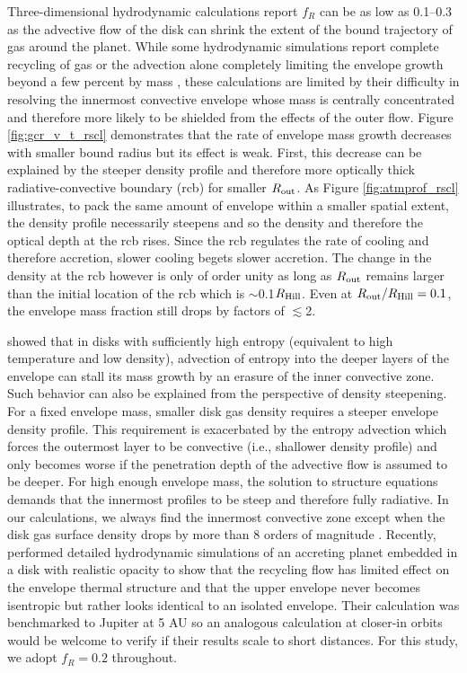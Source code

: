 \documentclass[twocolumn]{aastex631}
\begin{document}
Three-dimensional hydrodynamic calculations report $f_R$ can be as low as 0.1--0.3 \citep{Lambrechts17,Fung19} as the advective flow of the disk can shrink the extent of the bound trajectory of gas around the planet.
While some hydrodynamic simulations report complete recycling of gas or the advection alone completely limiting the envelope growth beyond a few percent by mass \citep[e.g.,][]{Bethune19,Moldenhauer21}, these calculations are limited by their difficulty in resolving the innermost convective envelope whose mass is centrally concentrated \citep{Lee14} and therefore more likely to be shielded from the effects of the outer flow. 
Figure \ref{fig:gcr_v_t_rscl} demonstrates that the rate of envelope mass growth decreases with smaller bound radius but its effect is weak. First, this decrease can be explained by the steeper density profile and therefore more optically thick radiative-convective boundary (rcb) for smaller $R_{\rm out}$. As Figure \ref{fig:atmprof_rscl} illustrates, to pack the same amount of envelope within a smaller spatial extent, the density profile necessarily steepens and so the density and therefore the optical depth at the rcb rises. Since the rcb regulates the rate of cooling and therefore accretion, slower cooling begets slower accretion. The change in the density at the rcb however is only of order unity as long as $R_{\rm out}$ remains larger than the initial location of the rcb which is $\sim$0.1$R_{\rm Hill}$. Even at $R_{\rm out}/R_{\rm Hill} = 0.1$, the envelope mass fraction still drops by factors of $\lesssim$2.

\citet{Ali-Dib20} showed that in disks with sufficiently high entropy (equivalent to high temperature and low density), advection of entropy into the deeper layers of the envelope can stall its mass growth by an erasure of the inner convective zone. Such behavior can also be explained from the perspective of density steepening. For a fixed envelope mass, smaller disk gas density requires a steeper envelope density profile. This requirement is exacerbated by the entropy advection which forces the outermost layer to be convective (i.e., shallower density profile) and only becomes worse if the penetration depth of the advective flow is assumed to be deeper. For high enough envelope mass, the solution to structure equations demands that the innermost profiles to be steep and therefore fully radiative. In our calculations, we always find the innermost convective zone except when the disk gas surface density drops by more than 8 orders of magnitude \citep{Lee18}. Recently, \citet{Zhu_zhaohuan21} performed detailed hydrodynamic simulations of an accreting planet embedded in a disk with realistic opacity to show that the recycling flow has limited effect on the envelope thermal structure and that the upper envelope never becomes isentropic but rather looks identical to an isolated envelope. Their calculation was benchmarked to Jupiter at 5 AU so an analogous calculation at closer-in orbits would be welcome to verify if their results scale to short distances. For this study, we adopt $f_R = 0.2$ throughout.
\end{document}

